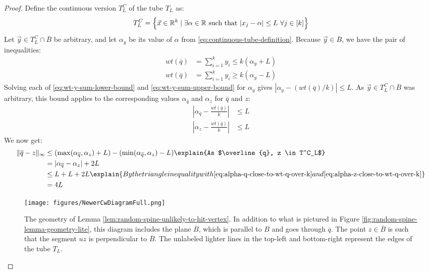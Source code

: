 \documentclass[11pt]{article}
\begin{document}
\begin{proof}
    Define the continuous version $T^C_L$ of the tube $T_L$ as:
    \begin{align}
        T^C_L = \Bigl\{\vec{x} \in \mathbb{R}^k \mid \exists \alpha \in \mathbb{R} \mbox{ such that } |x_j - \alpha| \leq L\  \forall j \in [k] \Bigr\} \label{eq:continuous-tube-definition}
    \end{align}
    Let $\vec{y} \in T_L^C \cap \overline{B}$ be arbitrary, and let $\alpha_y$ be its value of $\alpha$ from \eqref{eq:continuous-tube-definition}. Because $\vec{y} \in \overline{B}$, we have the pair of inequalities:
    \begin{align}
        wt(\overline{q}) &= \sum_{i=1}^k y_i \leq k (\alpha_y + L) \label{eq:wt-y-sum-upper-bound} \\
        wt(\overline{q}) &= \sum_{i=1}^k y_i \geq k (\alpha_y - L) \label{eq:wt-y-sum-lower-bound}
    \end{align}
    Solving each of \eqref{eq:wt-y-sum-lower-bound} and \eqref{eq:wt-y-sum-upper-bound} for $\alpha_y$ gives $|\alpha_y - (wt(\overline{q})/k)| \leq L$. As $\vec{y} \in T_L^C \cap \overline{B}$ was arbitrary, this bound applies to the corresponding values $\alpha_{\overline{q}}$ and $\alpha_z$ for $\overline{q}$ and $z$:
    \begin{align}
        \left| \alpha_{\overline{q}} - \frac{wt(\overline{q})}{k} \right| &\leq L \label{eq:alpha-q-close-to-wt-q-over-k} \\
        \left| \alpha_{z} - \frac{wt(\overline{q})}{k} \right| &\leq L \label{eq:alpha-z-close-to-wt-q-over-k}
    \end{align}
    We now get:
    \begin{align}
        \|\overline{q} - z\|_{\infty} &\leq (\max (\alpha_{\overline{q}}, \alpha_z) + L) - (\min (\alpha_{\overline{q}}, \alpha_z) - L) \explain{As $\overline{q}, z \in T^C_L$}\\
        &= |\alpha_{\overline{q}} - \alpha_z| + 2L \\
        &\leq L + L + 2L \explain{By the triangle inequality with \eqref{eq:alpha-q-close-to-wt-q-over-k} and \eqref{eq:alpha-z-close-to-wt-q-over-k}} \\
        &= 4L \label{eq:qbar-minus-z-small}
    \end{align}

\begin{figure}[h!]
        \centering 
        \texttt{[image: figures/NewerCwDiagramFull.png]}
        \caption{The geometry of Lemma \ref{lem:random-spine-unlikely-to-hit-vertex}. In addition to what is pictured in Figure \ref{fig:random-spine-lemma-geometry-lite}, this diagram includes the plane $\overline{B}$, which is parallel to $B$ and goes through $\overline{q}$. The point $z \in \overline{B}$ is such that the segment $uz$ is perpendicular to $\overline{B}$. The unlabeled lighter lines in the top-left and bottom-right represent the edges of the tube $T_L$.}
    \end{figure}


\end{proof}
\end{document}
